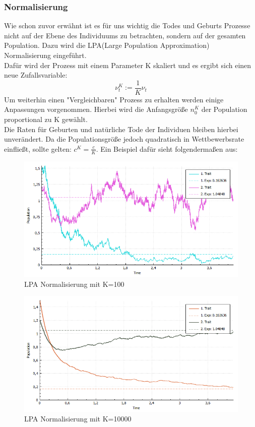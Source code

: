 \documentclass{article}
\begin{document}
		\subsubsection{Normalisierung}
		Wie schon zuvor erwähnt ist es für uns wichtig die Todes und Geburts Prozesse nicht auf der Ebene des Individuums zu betrachten, sondern auf der gesamten Population. Dazu wird die LPA(Large Population Approximation) Normalisierung eingeführt.\\
		Dafür wird der Prozess mit einem Parameter K skaliert und es ergibt sich einen neue Zufallsvariable:
		\[ \nu_t^K := \frac{1}{K} \nu_t \]
		Um weiterhin einen "{}Vergleichbaren"{} Prozess zu erhalten werden einige Anpassungen vorgenommen.
		Hierbei wird die Anfangsgröße $ n_0^K $ der Population proportional zu K gewählt.\\
		Die Raten für Geburten und natürliche Tode der Individuen bleiben hierbei unverändert. Da die Populationsgröße jedoch quadratisch in Wettbewerbsrate einfließt, sollte gelten: $ c^K = \frac{c}{K} $. Ein Beispiel dafür sieht folgendermaßen aus:
		\begin{figure}[H]
			\centering
			\includegraphics[width=0.7\linewidth]{./Pictures/LPANormalisierungK100}
			\caption[LPAK100]{LPA Normalisierung mit K=100}
			\label{LPA Normalisierung K=100}
		\end{figure}
		\begin{figure}[H]
			\centering
			\includegraphics[width=0.7\linewidth]{./Pictures/LPANormalisierungK10000}
			\caption[LPAK100]{LPA Normalisierung mit K=10000}
			\label{LPA Normalisierung K=10000}
		\end{figure}
\end{document}
